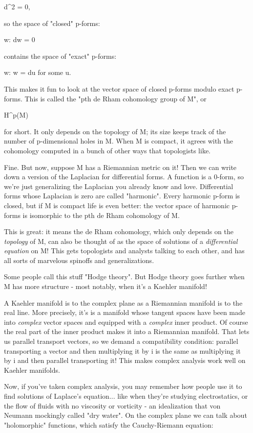 d^{2} = 0,

so the space of "closed" p-forms:

{w: dw = 0}

contains the space of "exact" p-forms:

{w: w = du for some u}.

This makes it fun to look at the vector space of closed p-forms modulo
exact p-forms.  This is called the "pth de Rham cohomology group of
M", or

H^{p}(M)

for short.  It only depends on the topology of M; its size keeps track
of the number of p-dimensional holes in M.  When M is compact, it 
agrees with the cohomology computed in a bunch of other ways that 
topologists like.

Fine.  But now, suppose M has a Riemannian metric on it!  Then we can
write down a version of the Laplacian for differential forms.  A
function is a 0-form, so we're just generalizing the Laplacian you
already know and love.  Differential forms whose Laplacian is zero are
called "harmonic".  Every harmonic p-form is closed, but if M is compact
life is even better: the vector space of harmonic p-forms is isomorphic
to the pth de Rham cohomology of M.

This is great: it means the de Rham cohomology, which only depends on
the \emph{topology} of M, can also be thought of as the space of solutions
of a \emph{differential equation} on M!  This gets topologists and analysts
talking to each other, and has all sorts of marvelous spinoffs and
generalizations.

Some people call this stuff "Hodge theory".  But Hodge theory
goes further when M has more structure - most notably, when it's
a Kaehler manifold!  

A Kaehler manifold is to the complex plane as a Riemannian manifold is
to the real line.  More precisely, it's is a manifold whose tangent
spaces have been made into \emph{complex} vector spaces and equipped with a
\emph{complex} inner product.  Of course the real part of the inner product
makes it into a Riemannian manifold.  That lets us parallel transport
vectors, so we demand a compatibility condition: parallel transporting 
a vector and then multiplying it by i is the same as multiplying it by i
and then parallel transporting it!  This makes complex analysis work
well on Kaehler manifolds.

Now, if you've taken complex analysis, you may remember how people use
it to find solutions of Laplace's equation... like when they're studying
electrostatics, or the flow of fluids with no viscosity or vorticity -
an idealization that von Neumann mockingly called "dry water".  On 
the complex plane we can talk about "holomorphic" functions, which 
satisfy the Cauchy-Riemann equation:

